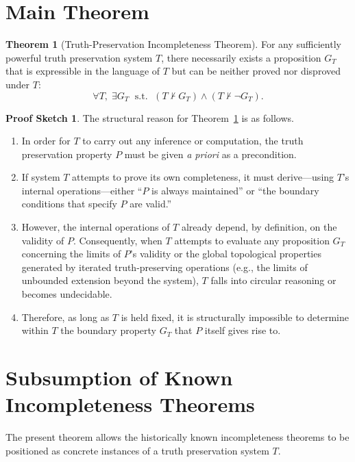 \documentclass[11pt,a4paper]{article}
\theoremstyle{definition}
\newtheorem{theorem}{Theorem}[section]
\newtheorem{proof_outline}{Proof Sketch}
\begin{document}
\section{Main Theorem}

\begin{theorem}[Truth-Preservation Incompleteness Theorem]
\label{thm:incompleteness}
For any sufficiently powerful truth preservation system $T$, there necessarily exists a proposition $G_T$ that is expressible in the language of $T$ but can be neither proved nor disproved under $T$:
\[
\forall T,\; \exists G_T \;\text{ s.t. }\; (T \nvdash G_T) \land (T \nvdash \neg G_T).
\]
\end{theorem}

\begin{proof_outline}
The structural reason for Theorem~\ref{thm:incompleteness} is as follows.
\begin{enumerate}
    \item In order for $T$ to carry out any inference or computation, the truth preservation property $P$ must be given \emph{a priori} as a precondition.
    \item If system $T$ attempts to prove its own completeness, it must derive---using $T$'s internal operations---either ``$P$ is always maintained'' or ``the boundary conditions that specify $P$ are valid.''
    \item However, the internal operations of $T$ already depend, by definition, on the validity of $P$. Consequently, when $T$ attempts to evaluate any proposition $G_T$ concerning the limits of $P$'s validity or the global topological properties generated by iterated truth-preserving operations (e.g., the limits of unbounded extension beyond the system), $T$ falls into circular reasoning or becomes undecidable.
    \item Therefore, as long as $T$ is held fixed, it is structurally impossible to determine within $T$ the boundary property $G_T$ that $P$ itself gives rise to.
\end{enumerate}
\end{proof_outline}

\section{Subsumption of Known Incompleteness Theorems}

The present theorem allows the historically known incompleteness theorems to be positioned as concrete instances of a truth preservation system $T$.
\end{document}
